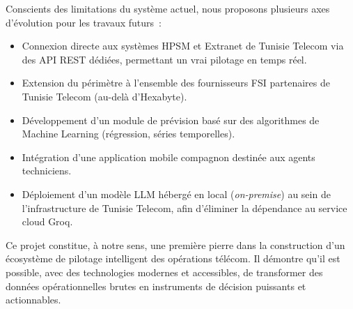 \documentclass[11pt,a4paper]{report}
\begin{document}
Conscients des limitations du système actuel, nous proposons plusieurs axes d'évolution pour les travaux futurs~:

\begin{itemize}
  \item Connexion directe aux systèmes HPSM et Extranet de Tunisie Telecom via des API REST dédiées, permettant un vrai pilotage en temps réel.
  \item Extension du périmètre à l'ensemble des fournisseurs FSI partenaires de Tunisie Telecom (au-delà d'Hexabyte).
  \item Développement d'un module de prévision basé sur des algorithmes de Machine Learning (régression, séries temporelles).
  \item Intégration d'une application mobile compagnon destinée aux agents techniciens.
  \item Déploiement d'un modèle LLM hébergé en local (\textit{on-premise}) au sein de l'infrastructure de Tunisie Telecom, afin d'éliminer la dépendance au service cloud Groq.
\end{itemize}

Ce projet constitue, à notre sens, une première pierre dans la construction d'un écosystème de pilotage intelligent des opérations télécom. Il démontre qu'il est possible, avec des technologies modernes et accessibles, de transformer des données opérationnelles brutes en instruments de décision puissants et actionnables.
\end{document}
